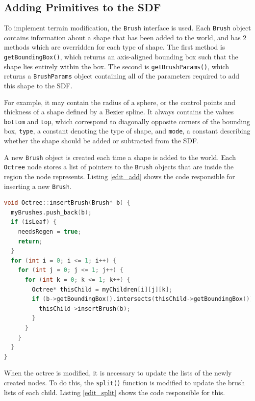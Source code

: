 \documentclass[11pt]{article}
\begin{document}
\subsection{Adding Primitives to the SDF}
\label{section:modification_implementation}

To implement terrain modification, the \texttt{Brush} interface is used. Each \texttt{Brush} object contains information about a shape that has been added to the world, and has 2 methods which are overridden for each type of shape. The first method is \texttt{getBoundingBox()}, which returns an axis-aligned bounding box such that the shape lies entirely within the box. The second is \texttt{getBrushParams()}, which returns a \texttt{BrushParams} object containing all of the parameters required to add this shape to the SDF. 

For example, it may contain the radius of a sphere, or the control points and thickness of a shape defined by a Bezier spline. It always contains the values \texttt{bottom} and \texttt{top}, which correspond to diagonally opposite corners of the bounding box, \texttt{type}, a constant denoting the type of shape, and \texttt{mode}, a constant describing whether the shape should be added or subtracted from the SDF.

A new \texttt{Brush} object is created each time a shape is added to the world. Each \texttt{Octree} node stores a list of pointers to the \texttt{Brush} objects that are inside the region the node represents. Listing \ref{edit_add} shows the code responsible for inserting a new \texttt{Brush}.

\begin{lstlisting}[language=C++,label={edit_add},caption={Code to add a new brush into the octree. The brush is added recursively to lists at all levels, so each leaf has a list of exactly the brushes that are partially inside it. The flag \texttt{needsRegen} indicates that the geometry within the chunk has changed.}]
void Octree::insertBrush(Brush* b) {
  myBrushes.push_back(b);
  if (isLeaf) {
    needsRegen = true;
    return;
  }
  for (int i = 0; i <= 1; i++) {
    for (int j = 0; j <= 1; j++) {
      for (int k = 0; k <= 1; k++) {
        Octree* thisChild = myChildren[i][j][k];
        if (b->getBoundingBox().intersects(thisChild->getBoundingBox())) {
          thisChild->insertBrush(b);
        }
      }
    }
  }
}
\end{lstlisting}

When the octree is modified, it is necessary to update the lists of the newly created nodes. To do this, the \texttt{split()} function is modified to update the brush lists of each child. Listing \ref{edit_split} shows the code responsible for this.
\end{document}
